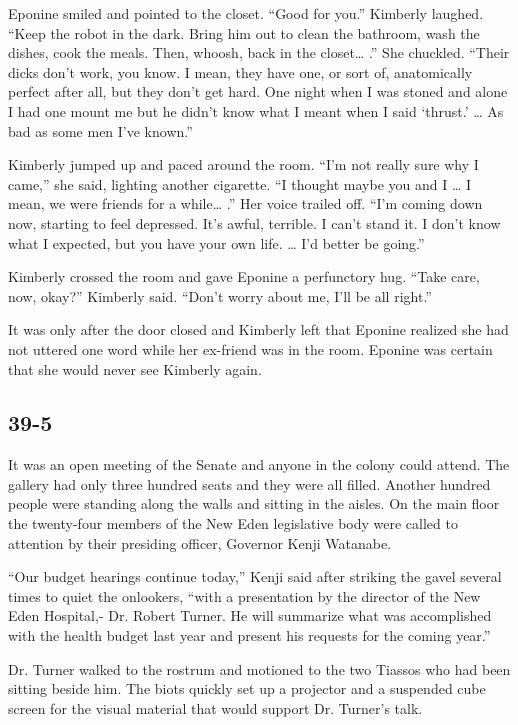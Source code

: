 \documentclass[]{article}
\begin{document}
{Eponine smiled and pointed to the closet. “Good for you.” Kimberly laughed. “Keep the robot in the dark. Bring him out to clean the bathroom, wash the dishes, cook the meals. Then, whoosh, back in the closet… .” She chuckled. “Their dicks don’t work, you know. I mean, they have one, or sort of, anatomically perfect after all, but they don’t get hard. One night when I was stoned and alone I had one mount me but he didn’t know what I meant when I said ‘thrust.’ … As bad as some men I’ve known.”

Kimberly jumped up and paced around the room. “I’m not really sure why I came,” she said, lighting another cigarette. “I thought maybe you and I … I mean, we were friends for a while… .” Her voice trailed off. “I’m coming down now, starting to feel depressed. It’s awful, terrible. I can’t stand it. I don’t know what I expected, but you have your own life. … I’d better be going.”

Kimberly crossed the room and gave Eponine a perfunctory hug. “Take care, now, okay?” Kimberly said. “Don’t worry about me, I’ll be all right.”

It was only after the door closed and Kimberly left that Eponine realized she had not uttered one word while her ex-friend was in the room. Eponine was certain that she would never see Kimberly again.


\subsection{39-5}

It was an open meeting of the Senate and anyone in the colony could attend. The gallery had only three hundred seats and they were all filled. Another hundred people were standing along the walls and sitting in the aisles. On the main floor the twenty-four members of the New Eden legislative body were called to attention by their presiding officer, Governor Kenji Watanabe.

“Our budget hearings continue today,” Kenji said after striking the gavel several times to quiet the onlookers, “with a presentation by the director of the New Eden Hospital,- Dr. Robert Turner. He will summarize what was accomplished with the health budget last year and present his requests for the coming year.”

Dr. Turner walked to the rostrum and motioned to the two Tiassos who had been sitting beside him. The biots quickly set up a projector and a suspended cube screen for the visual material that would support Dr. Turner’s talk.

}
\end{document}
